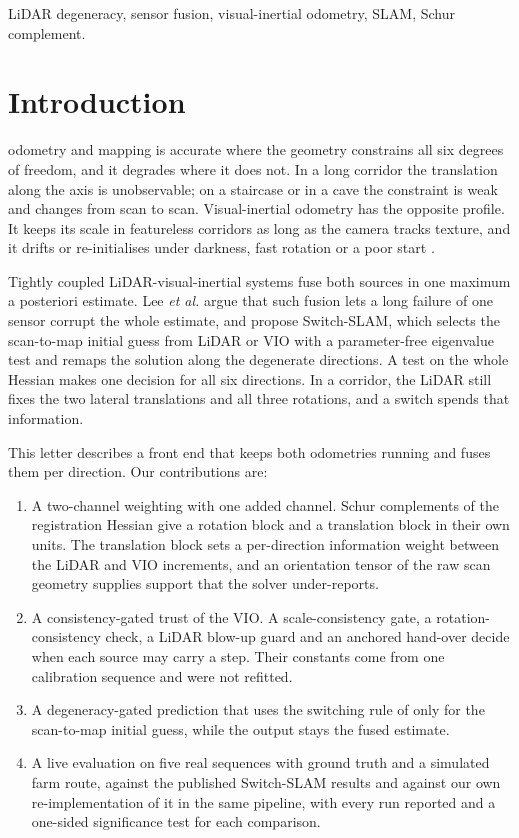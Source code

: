 \documentclass[journal]{IEEEtran}
\begin{document}
\begin{IEEEkeywords}
LiDAR degeneracy, sensor fusion, visual-inertial odometry, SLAM, Schur complement.
\end{IEEEkeywords}

\section{Introduction}
 odometry and mapping \cite{loam2014,liosam2020,fastlio2} is accurate where the geometry constrains all six degrees of freedom, and it degrades where it does not. In a long corridor the translation along the axis is unobservable; on a staircase or in a cave the constraint is weak and changes from scan to scan. Visual-inertial odometry \cite{vinsmono2018} has the opposite profile. It keeps its scale in featureless corridors as long as the camera tracks texture, and it drifts or re-initialises under darkness, fast rotation or a poor start \cite{cadena2016,ebadi2024}.

Tightly coupled LiDAR-visual-inertial systems \cite{lvisam2021,r2live2021,r3live2022,fastlivo2022,superodom2021} fuse both sources in one maximum a posteriori estimate. Lee \emph{et al.} \cite{switchslam2024} argue that such fusion lets a long failure of one sensor corrupt the whole estimate, and propose Switch-SLAM, which selects the scan-to-map initial guess from LiDAR or VIO with a parameter-free eigenvalue test and remaps the solution along the degenerate directions. A test on the whole Hessian makes one decision for all six directions. In a corridor, the LiDAR still fixes the two lateral translations and all three rotations, and a switch spends that information.

This letter describes a front end that keeps both odometries running and fuses them per direction. Our contributions are:
\begin{enumerate}
\item A two-channel weighting with one added channel. Schur complements of the registration Hessian give a rotation block and a translation block in their own units. The translation block sets a per-direction information weight between the LiDAR and VIO increments, and an orientation tensor of the raw scan geometry supplies support that the solver under-reports.
\item A consistency-gated trust of the VIO. A scale-consistency gate, a rotation-consistency check, a LiDAR blow-up guard and an anchored hand-over decide when each source may carry a step. Their constants come from one calibration sequence and were not refitted.
\item A degeneracy-gated prediction that uses the switching rule of \cite{switchslam2024} only for the scan-to-map initial guess, while the output stays the fused estimate.
\item A live evaluation on five real sequences with ground truth and a simulated farm route, against the published Switch-SLAM results and against our own re-implementation of it in the same pipeline, with every run reported and a one-sided significance test for each comparison.
\end{enumerate}
\end{document}
